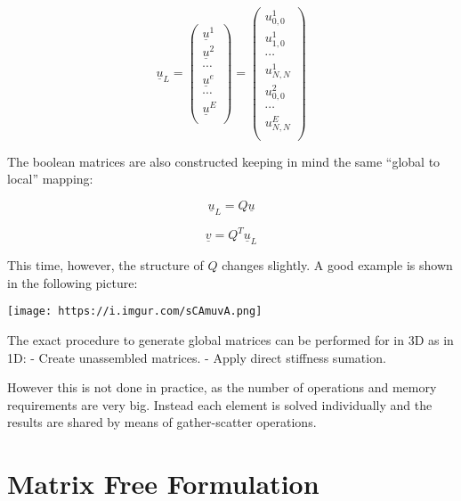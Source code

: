 \documentclass[
  a4paper,
  10pt]{article}
\begin{document}
\begin{equation}
    \underline{u}_L=
    \begin{pmatrix}
    \underline{u}^{1} \\
    \underline{u}^{2} \\
    \cdots \\
    \underline{u}^{e} \\
    \cdots \\
    \underline{u}^{E} \\
    \end{pmatrix}= 
    \begin{pmatrix}
    {u}^{1}_{0,0} \\
    {u}^{1}_{1,0} \\
    \cdots \\
    {u}^{1}_{N,N} \\
    {u}^{2}_{0,0} \\
    \cdots \\
    {u}^{E}_{N,N} \\
    \end{pmatrix}
\end{equation}

The boolean matrices are also constructed keeping in mind the same
``global to local'' mapping:

\begin{equation}
    \underline{u}_L=Q\underline{u}
\end{equation}

\begin{equation}
    \underline{v}=Q^{T}\underline{u}_L
\end{equation}

This time, however, the structure of \(Q\) changes slightly. A good
example is shown in the following picture:

\texttt{[image: https://i.imgur.com/sCAmuvA.png]}

The exact procedure to generate global matrices can be performed for in
3D as in 1D: - Create unassembled matrices. - Apply direct stiffness
sumation.

However this is not done in practice, as the number of operations and
memory requirements are very big. Instead each element is solved
individually and the results are shared by means of gather-scatter
operations.

\hypertarget{matrix-free-formulation}{%
\section{Matrix Free Formulation}\label{matrix-free-formulation}}
\end{document}
